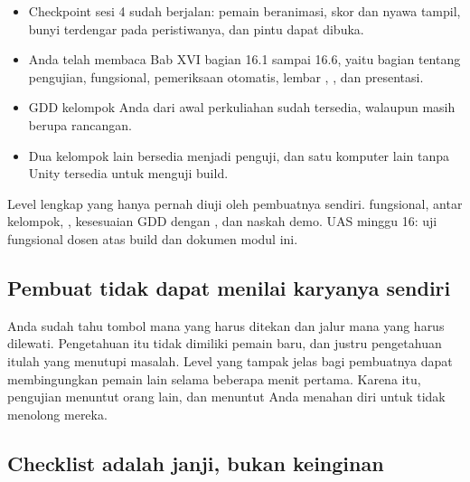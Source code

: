 
\begin{prasyaratbox}
\begin{itemize}[leftmargin=1.4em, itemsep=0.25em]
  \item Checkpoint sesi 4 sudah berjalan: pemain beranimasi, skor dan nyawa
        tampil, bunyi terdengar pada peristiwanya, dan pintu dapat dibuka.
  \item Anda telah membaca Bab XVI bagian 16.1 sampai 16.6, yaitu bagian
        tentang pengujian,  fungsional, pemeriksaan
        otomatis, lembar , , dan
        presentasi.
  \item GDD kelompok Anda dari awal perkuliahan sudah tersedia, walaupun masih
        berupa rancangan.
  \item Dua kelompok lain bersedia menjadi penguji, dan satu komputer lain
        tanpa Unity tersedia untuk menguji build.
\end{itemize}
\end{prasyaratbox}


\petasesi
  {Level lengkap yang hanya pernah diuji oleh pembuatnya sendiri.}
  { fungsional,  antar kelompok,
   , kesesuaian GDD dengan , dan naskah demo.}
  {UAS minggu 16: uji fungsional dosen atas build dan dokumen modul ini.}


\subsection*{Pembuat tidak dapat menilai karyanya sendiri}

Anda sudah tahu tombol mana yang harus ditekan dan jalur mana yang harus
dilewati. Pengetahuan itu tidak dimiliki pemain baru, dan justru pengetahuan
itulah yang menutupi masalah. Level yang tampak jelas bagi pembuatnya dapat
membingungkan pemain lain selama beberapa menit pertama. Karena itu, pengujian
menuntut orang lain, dan menuntut Anda menahan diri untuk tidak menolong
mereka.

\subsection*{Checklist adalah janji, bukan keinginan}

